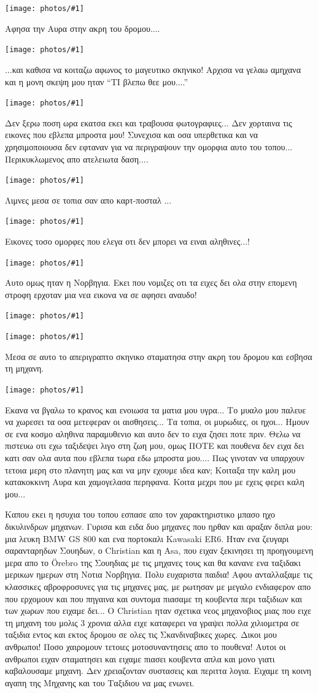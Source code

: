 \documentclass[11pt, letterpaper]{book}
\newcommand\photo[1]{\begin{center}\noindent\texttt{[image: photos/\#1]}\end{center}}
\begin{document}
\photo{152.jpg}

Αφησα την Αυρα στην ακρη του δρομου.... 

\photo{153.jpg}

...και καθισα να κοιταζω αφωνος το μαγευτικο σκηνικο! Αρχισα να γελαω αμηχανα και η μονη σκεψη μου ηταν ``ΤΙ βλεπω θεε μου....''

\photo{154.jpg}

Δεν ξερω ποση ωρα εκατσα εκει και τραβουσα φωτογραφιες... Δεν χορταινα τις εικονες που εβλεπα μπροστα μου!
Συνεχισα και οσα υπερθετικα και να χρησιμοποιουσα δεν εφταναν για να περιγραψουν την ομορφια αυτο του τοπου...
Περικυκλωμενος απο ατελειωτα δαση....

\photo{155.jpg}

Λιμνες μεσα σε τοπια σαν απο καρτ-ποσταλ ...

\photo{156.jpg}

Εικονες τοσο ομορφες που ελεγα οτι δεν μπορει να ειναι αληθινες...!

\photo{157.jpg}

Αυτο ομως ηταν η Νορβηγια. Εκει που νομιζες οτι τα ειχες δει ολα στην επομενη στροφη ερχοταν μια νεα εικονα να σε αφησει αναυδο!

\photo{158.jpg}
\photo{159.jpg}

Μεσα σε αυτο το απεριγραπτο σκηνικο σταματησα στην ακρη του δρομου και εσβησα τη μηχανη. 

\photo{160.jpg}

Εκανα να βγαλω το κρανος και ενοιωσα τα ματια μου υγρα... Το μυαλο μου παλευε να χωρεσει τα οσα μετεφεραν οι αισθησεις... Τα τοπια, οι μυρωδιες, οι ηχοι... Ημουν σε ενα κοσμο αληθινα παραμυθενιο και αυτο δεν το ειχα ζησει ποτε πριν. Θελω να πιστευω οτι εχω ταξιδεψει λιγο στη ζωη μου, ομως ΠΟΤΕ και πουθενα δεν ειχα δει κατι σαν ολα αυτα που εβλεπα τωρα εδω μπροστα μου....
Πως γινοταν να υπαρχουν τετοια μερη στο πλανητη μας και να μην εχουμε ιδεα καν;
Κοιταξα την καλη μου κατακοκκινη Αυρα και χαμογελασα περηφανα. Κοιτα μεχρι που με εχεις φερει καλη μου...

Καπου εκει η ησυχια του τοπου εσπασε απο τον χαρακτηριστικο μπασο ηχο δικυλινδρων μηχανων. Γυρισα και ειδα δυο μηχανες που ηρθαν και αραξαν διπλα μου: μια λευκη BMW GS 800 και ενα πορτοκαλι Kawasaki ER6. Ηταν ενα ζευγαρι σαρανταρηδων Σουηδων, ο Christian και η Asa, που ειχαν ξεκινησει τη προηγουμενη μερα απο το Örebro της Σουηδιας με τις μηχανες τους και θα κανανε ενα ταξιδακι μερικων ημερων στη Νοτια Νορβηγια. Πολυ ευχαριστα παιδια! Αφου ανταλλαξαμε τις κλασσικες αβροφροσυνες για τις μηχανες μας, με ρωτησαν με μεγαλο ενδιαφερον απο που ερχομουν και που πηγαινα και συντομα πιασαμε τη κουβεντα περι ταξιδιων και των χωρων που ειχαμε δει... 
Ο Christian ηταν σχετικα νεος μηχανοβιος μιας που ειχε τη μηχανη του μολις 3 χρονια αλλα ειχε καταφερει να γραψει πολλα χιλιομετρα σε ταξιδια εντος και εκτος δρομου σε ολες τις Σκανδιναβικες χωρες. Δικοι μου ανθρωποι! 
Ποσο χαιρομουν τετοιες μοτοσυναντησεις απο το πουθενα! Αυτοι οι ανθρωποι ειχαν σταματησει και ειχαμε πιασει κουβεντα απλα και μονο γιατι καβαλουσαμε μηχανη. Δεν χρειαζονταν συστασεις και περιττα λογια. Ειχαμε τη κοινη αγαπη της Μηχανης και του Ταξιδιου να μας ενωνει.
\end{document}
